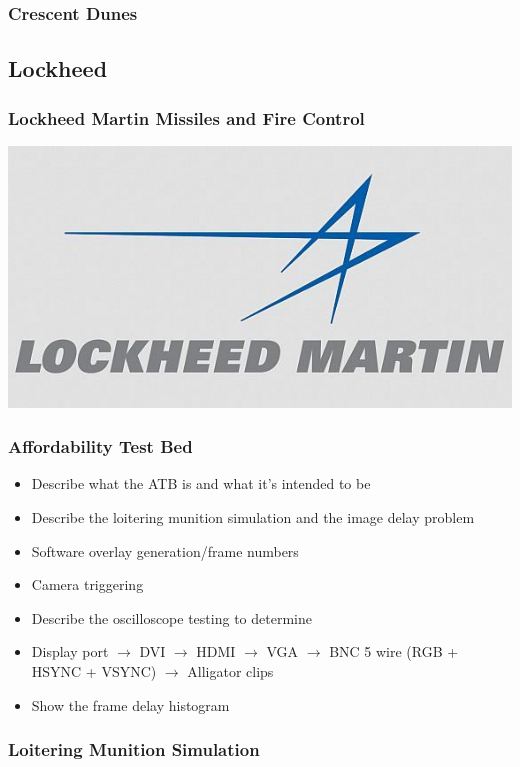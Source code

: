 \documentclass[aspectratio=169]{beamer}
\begin{document}
\begin{frame}
  \frametitle{Crescent Dunes}
\end{frame}

\subsection{Lockheed}
\begin{frame}
  \frametitle{Lockheed Martin Missiles and Fire Control}
  \center
  \includegraphics[width=.7\linewidth]{LockheedLogo}
\end{frame}

\begin{frame}
  \frametitle{Affordability Test Bed}
  \begin{itemize}
  \item Describe what the ATB is and what it's intended to be
  \item Describe the loitering munition simulation and the image delay problem
  \item Software overlay generation/frame numbers
  \item Camera triggering
  \item Describe the oscilloscope testing to determine 
  \item Display port $\rightarrow$ DVI $\rightarrow$ HDMI $\rightarrow$ VGA $\rightarrow$ BNC 5 wire (RGB + HSYNC + VSYNC) $\rightarrow$ Alligator clips
  \item Show the frame delay histogram
  \end{itemize}
\end{frame}

\begin{frame}
  \frametitle{Loitering Munition Simulation}
\end{frame}
\end{document}

